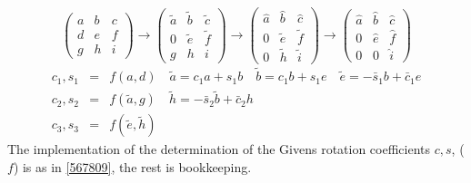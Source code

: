 \documentclass[a4paper,10pt]{article}
\begin{document}
\begin{displaymath}
\left(\begin{array}{ccc}a&b&c\\d&e&f\\g&h&i \end{array}\right)
\rightarrow \left(\begin{array}{ccc}\tilde{a}&\tilde{b}&\tilde{c}\\0&\tilde{e}&\tilde{f}\\g&h&i \end{array}\right)
\rightarrow \left(\begin{array}{ccc}\hat{a}&\hat{b}&\hat{c}\\0&\tilde{e}&\tilde{f}\\0&\tilde{h}&\tilde{i} \end{array}\right)
\rightarrow \left(\begin{array}{ccc}\hat{a}&\hat{b}&\hat{c}\\0&\hat{e}&\hat{f}\\0&0&\hat{i} \end{array}\right)
\end{displaymath}
\begin{eqnarray*}
 c_{1},s_{1} &=& f(a,d) \quad \tilde{a} = c_{1}a+s_{1}b \quad \tilde{b}=c_{1}b+s_{1}e \quad \tilde{e} = -\bar{s}_{1}b+\bar{c}_{1}e \\
 c_{2},s_{2} &=& f(\tilde{a},g) \quad \tilde{h} = -\bar{s}_{2}\tilde{b} + \bar{c}_{2}h \\
 c_{3},s_{3} &=& f(\tilde{e},\tilde{h})
\end{eqnarray*}
The implementation of the determination of the Givens rotation coefficients $c,s$, ($f$) is as in \ref{567809}, the rest is bookkeeping.
\end{document}
